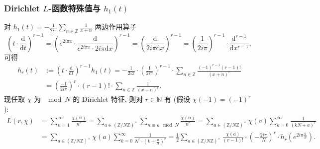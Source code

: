 \begin{frame}
\frametitle{Dirichlet $L$-函数特殊值与 $h_1(t)$}

对 $h_1(t) = - \frac{1}{2 i \pi} \sum_{n \in \mathbb{Z}} \frac{1}{x + n}$ 两边作用算子
\[
\left( t \cdot \frac{\mathrm{d}}{\mathrm{d}t} \right)^{r-1} = \left( e^{2 i \pi x} \cdot \frac{\mathrm{d}}{e^{2 i \pi x} \cdot 2 i \pi \mathrm{d}x} \right)^{r-1} = \left( \frac{\mathrm{d}}{2 i \pi \mathrm{d}x} \right)^{r-1} = \left(\frac{1}{2 i \pi}\right)^{r-1} \cdot \frac{\mathrm{d}^{r-1}}{\mathrm{d}x^{r-1}},
\]
可得
\begin{align*}
h_r(t) & := \left( t \cdot \frac{\mathrm{d}}{\mathrm{d}t} \right)^{r-1} h_1(t) = -\frac{1}{2 i \pi} \cdot \left(\frac{1}{2 i \pi}\right)^{r-1} \cdot \sum_{n \in \mathbb{Z}} \frac{(-1)^{r-1} (r-1)!}{(x + n)^r} \\
& = \left(\frac{-1}{2 i \pi}\right)^{r} \cdot (r - 1)! \cdot \sum_{n \in \mathbb{Z}} \frac{1}{(x + n)^r}.
\end{align*}
\pause
现任取 $\chi$ 为 $\mod N$ 的 Dirichlet 特征, 则对 $r \in \mathbb{N}$ 有 (假设 $\chi(-1) = (-1)^r$):
\begin{align*}
L(r, \chi) & = \sum_{n=1}^\infty \frac{\chi(n)}{n^r} = \sum_{a \in \left( \mathbb{Z}/N\mathbb{Z} \right)^\times} \sum_{n \equiv a \mod N} \frac{\chi(n)}{n^r} = \sum_{a \in \left( \mathbb{Z}/N\mathbb{Z} \right)^\times} \chi(a) \sum_{k=0}^\infty \frac{1}{(kN + a)^r} \\
& = \sum_{a \in \left( \mathbb{Z}/N\mathbb{Z} \right)^\times} \chi(a) \sum_{k=0}^\infty \frac{1}{N^r \cdot \left( k + \frac{a}{N} \right)^r} = \frac{1}{2} \sum_{a \in \left( \mathbb{Z}/N\mathbb{Z} \right)^\times} \frac{\chi(a)}{(r-1)!} \cdot \left( -\frac{2 i \pi}{N} \right)^r \cdot h_r\left( e^{2 i \pi \frac{a}{N}} \right).
\end{align*}

\end{frame}


